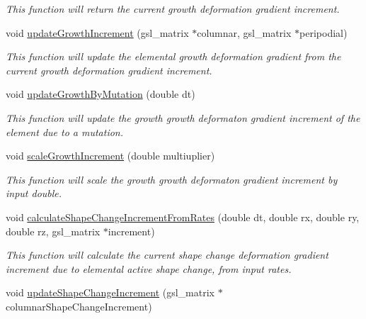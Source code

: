 \begin{DoxyCompactItemize}
\begin{DoxyCompactList}\small\item\em This function will return the current growth deformation gradient increment. \end{DoxyCompactList}\item 
void \hyperlink{classShapeBase_a009b5aed1c546db5e517f9f33f67b066}{update\+Growth\+Increment} (gsl\+\_\+matrix $\ast$columnar, gsl\+\_\+matrix $\ast$peripodial)
\begin{DoxyCompactList}\small\item\em This function will update the elemental growth deformation gradient from the current growth deformation gradient increment. \end{DoxyCompactList}\item 
void \hyperlink{classShapeBase_a466480b1e7de98250dd22c8cdb092d54}{update\+Growth\+By\+Mutation} (double dt)
\begin{DoxyCompactList}\small\item\em This function will update the growth growth deformaton gradient increment of the element due to a mutation. \end{DoxyCompactList}\item 
\hypertarget{classShapeBase_a33c8d69e858be0ad6414f4f5f64eeb3b}{}void \hyperlink{classShapeBase_a33c8d69e858be0ad6414f4f5f64eeb3b}{scale\+Growth\+Increment} (double multiuplier)\label{classShapeBase_a33c8d69e858be0ad6414f4f5f64eeb3b}

\begin{DoxyCompactList}\small\item\em This function will scale the growth growth deformaton gradient increment by input double. \end{DoxyCompactList}\item 
\hypertarget{classShapeBase_a2423a7dd85ab25b7eb38b5a954d732ab}{}void \hyperlink{classShapeBase_a2423a7dd85ab25b7eb38b5a954d732ab}{calculate\+Shape\+Change\+Increment\+From\+Rates} (double dt, double rx, double ry, double rz, gsl\+\_\+matrix $\ast$increment)\label{classShapeBase_a2423a7dd85ab25b7eb38b5a954d732ab}

\begin{DoxyCompactList}\small\item\em This function will calculate the current shape change deformation gradient increment due to elemental active shape change, from input rates. \end{DoxyCompactList}\item 
\hypertarget{classShapeBase_ab057fa6a1189b6bed5ac9201fc6ca620}{}void \hyperlink{classShapeBase_ab057fa6a1189b6bed5ac9201fc6ca620}{update\+Shape\+Change\+Increment} (gsl\+\_\+matrix $\ast$columnar\+Shape\+Change\+Increment)\label{classShapeBase_ab057fa6a1189b6bed5ac9201fc6ca620}


\end{DoxyCompactItemize}
